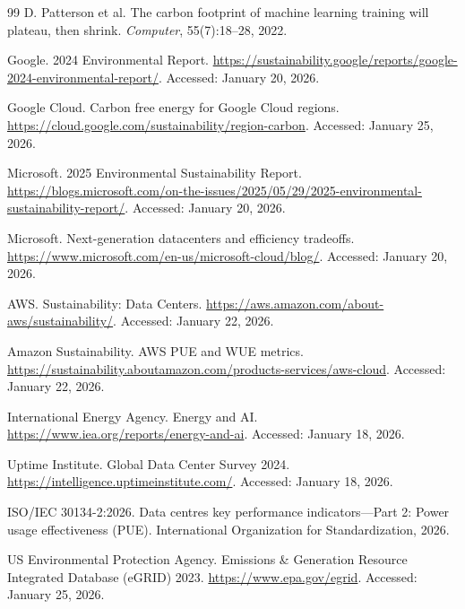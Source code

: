 \documentclass[11pt]{article}
\begin{document}
\begin{thebibliography}{99}
 D. Patterson et al. The carbon footprint of machine learning training will plateau, then shrink. \textit{Computer}, 55(7):18--28, 2022.


 Google. 2024 Environmental Report. \url{https://sustainability.google/reports/google-2024-environmental-report/}. Accessed: January 20, 2026.

 Google Cloud. Carbon free energy for Google Cloud regions. \url{https://cloud.google.com/sustainability/region-carbon}. Accessed: January 25, 2026.

 Microsoft. 2025 Environmental Sustainability Report. \url{https://blogs.microsoft.com/on-the-issues/2025/05/29/2025-environmental-sustainability-report/}. Accessed: January 20, 2026.

 Microsoft. Next-generation datacenters and efficiency tradeoffs. \url{https://www.microsoft.com/en-us/microsoft-cloud/blog/}. Accessed: January 20, 2026.

 AWS. Sustainability: Data Centers. \url{https://aws.amazon.com/about-aws/sustainability/}. Accessed: January 22, 2026.

 Amazon Sustainability. AWS PUE and WUE metrics. \url{https://sustainability.aboutamazon.com/products-services/aws-cloud}. Accessed: January 22, 2026.


 International Energy Agency. Energy and AI. \url{https://www.iea.org/reports/energy-and-ai}. Accessed: January 18, 2026.

 Uptime Institute. Global Data Center Survey 2024. \url{https://intelligence.uptimeinstitute.com/}. Accessed: January 18, 2026.

 ISO/IEC 30134-2:2026. Data centres key performance indicators---Part 2: Power usage effectiveness (PUE). International Organization for Standardization, 2026.


 US Environmental Protection Agency. Emissions \& Generation Resource Integrated Database (eGRID) 2023. \url{https://www.epa.gov/egrid}. Accessed: January 25, 2026.


\end{thebibliography}
\end{document}
